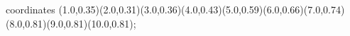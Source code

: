 					coordinates { (1.0,0.35)(2.0,0.31)(3.0,0.36)(4.0,0.43)(5.0,0.59)(6.0,0.66)(7.0,0.74)(8.0,0.81)(9.0,0.81)(10.0,0.81)};